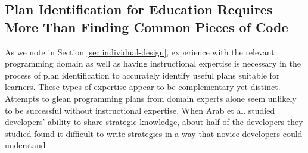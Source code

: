 





\subsection{Plan Identification for Education Requires More Than Finding Common Pieces of Code}


As we note in Section \ref{sec:individual-design}, experience with the relevant programming domain as well as having instructional expertise is necessary in the process of plan identification to accurately identify useful plans suitable for learners. These types of expertise appear to be complementary yet distinct. Attempts to glean programming plans from domain experts alone seem unlikely to be successful without instructional expertise.
When Arab et al. studied developers' ability to share strategic knowledge, about half of the developers they studied found it difficult to write strategies in a way that novice developers could understand~\cite{Arab_StartegySharingSystem_CHI-2022}.


